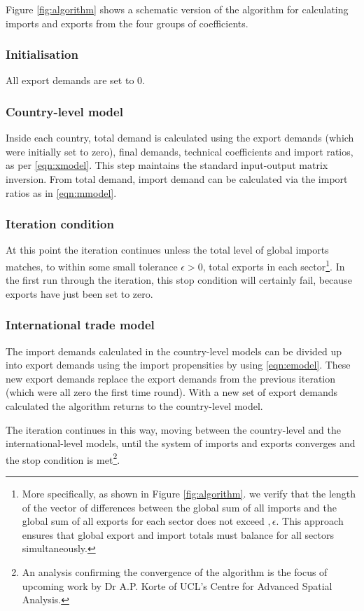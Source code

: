 \documentclass[a4paper]{article}
\begin{document}
Figure \ref{fig:algorithm} shows a schematic version of the algorithm for calculating imports and exports from the four groups of coefficients.
\subsubsection*{Initialisation}
All export demands are set to 0.

\subsubsection*{Country-level model}
Inside each country, total demand is calculated using the export demands (which were initially set to zero), final demands, technical coefficients and import ratios, as per \cref{eqn:xmodel}.
This step maintains the standard input-output matrix inversion.
From total demand, import demand can be calculated via the import ratios as in \cref{eqn:mmodel}.

\subsubsection*{Iteration condition}
At this point the iteration continues unless the total level of global imports matches, to within some small tolerance $\epsilon > 0$, total exports in each sector\footnote{More specifically, as shown in Figure \ref{fig:algorithm}. we verify that the length of the vector of differences between the global sum of all imports and the global sum of all exports for each sector does not exceed $, \epsilon$. This approach ensures that global export and import totals must balance for all sectors simultaneously.}.
In the first run through the iteration, this stop condition will certainly fail, because exports have just been set to zero.

\subsubsection*{International trade model}
The import demands calculated in the country-level models can be divided up into export demands using the import propensities by using \cref{eqn:emodel}.
These new export demands replace the export demands from the previous iteration (which were all zero the first time round).
With a new set of export demands calculated the algorithm returns to the country-level model.

The iteration continues in this way, moving between the country-level and the international-level models, until the system of imports and exports converges and the stop condition is met\footnote{An analysis confirming the convergence of the algorithm is the focus of upcoming work by Dr A.P. Korte of UCL's Centre for Advanced Spatial Analysis.}.
\end{document}
